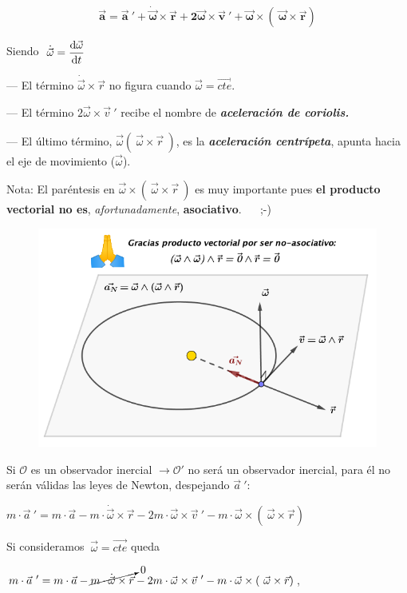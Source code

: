 $$\boldsymbol{ \displaystyle \vec a = \vec a\ ' + \dot{\vec \omega} \times \vec r + 2 \vec \omega \times \vec v\ '+ \vec \omega \times ( \ \vec \omega  \times  \vec r) }$$

Siendo $ \ \dot{\vec \omega}=\displaystyle \dv{\vec \omega}{t}$

--- El término $\dot{\vec \omega} \times \vec r$ no figura cuando $\vec \omega=\overrightarrow{cte}$.

--- El término $2\vec \omega \times \vec v\ '$ recibe el nombre de \textbf{\emph{aceleración de coriolis.}}

--- El último término, $\vec \omega (\ \vec \omega \times \vec r \ )$, es la \textbf{\emph{aceleración centrípeta}}, apunta hacia el eje de movimiento ($\vec \omega$).

Nota: El paréntesis en $\vec \omega \times ( \ \vec \omega  \times  \vec r \ )$ es muy importante pues \textbf{el producto vectorial no es}, \emph{afortunadamente}, \textbf{asociativo}. $\quad$ ;-)

\begin{figure}[H]
	\centering
	\includegraphics[width=.9\textwidth]{imagenes/imagenes02/T02IM33.png}
\end{figure}


Si $\mathcal O$ es un observador inercial $\to \mathcal O'$ no será un observador inercial, para él no serán válidas las leyes de Newton, despejando $\vec a \ '  $:

$ \displaystyle m \cdot \vec a\ ' =  m \cdot \vec a -  m \cdot \dot{\vec \omega} \times \vec r - 2  m \cdot \vec \omega \times \vec v\ '-  m \cdot \vec \omega \times ( \ \vec \omega  \times  \vec r) $


Si consideramos $\ \vec \omega=\overrightarrow{cte}$ queda

$ \displaystyle m \cdot \vec a\ ' =  m \cdot \vec a -  \cancelto{0}{m \cdot \dot{\vec \omega} \times \vec r} - 2  m \cdot \vec \omega \times \vec v\ '-  m \cdot \vec \omega \times ( \ \vec \omega  \times  \vec r) $,


